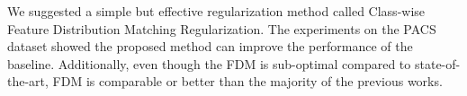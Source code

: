 We suggested a simple but effective regularization method called Class-wise Feature Distribution Matching Regularization. The experiments on the PACS dataset showed the proposed method can improve the performance of the baseline. Additionally, even though the FDM is sub-optimal compared to state-of-the-art, FDM is comparable or better than the majority of the previous works.